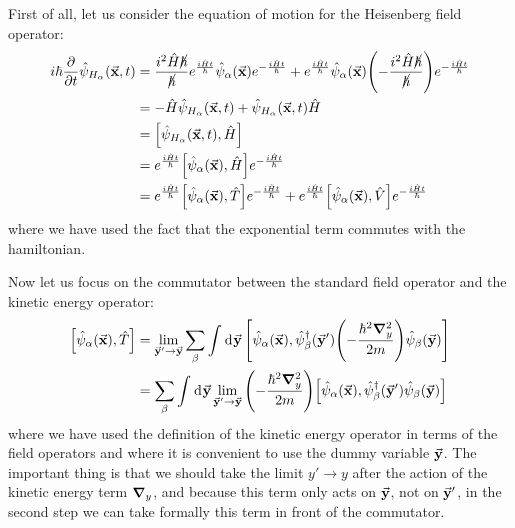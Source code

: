 \documentclass[../main/main.tex]{subfiles}
\begin{document}
First of all, let us consider the equation of motion for the Heisenberg field operator: 
\begin{equation}
\begin{split}
i \hbar  \pdv{}{t} \hat{\psi }_{H_ \alpha } (\va{x},t)   &=
\frac{i^2 \hat{H} \cancel{\hbar}  }{\cancel{\hbar } } e^{\frac{i \hat{H} t}{\hbar }} \hat{\psi }_ \alpha (\va{x}) e^{-\frac{i \hat{H} t}{\hbar }}  +
e^{\frac{i \hat{H} t}{\hbar }} \hat{\psi }_ \alpha (\va{x}) \qty(-\frac{i^2 \hat{H} \cancel{\hbar }  }{\cancel{\hbar }}) e^{-\frac{i \hat{H} t}{\hbar }}    \\
& = - \hat{H} \hat{\psi }_{H _ \alpha } (\va{x},t) +  \hat{\psi }_{H _ \alpha } (\va{x},t)   \hat{H} \\
&= \qty[\hat{\psi }_{H _ \alpha } (\va{x},t) , \hat{H} ] \\
& = e^{\frac{i \hat{H} t}{\hbar }} \qty[\hat{\psi }_{\alpha } (\va{x}) , \hat{H} ]  e^{-\frac{i \hat{H} t}{\hbar }} \\
& = e^{\frac{i \hat{H} t}{\hbar }} \qty[\hat{\psi }_{\alpha } (\va{x}) , \hat{T} ]  e^{-\frac{i \hat{H} t}{\hbar }} + e^{\frac{i \hat{H} t}{\hbar }} \qty[\hat{\psi }_{\alpha } (\va{x}) , \hat{V} ]  e^{-\frac{i \hat{H} t}{\hbar }}
\end{split}
\label{eq:7_3}
\end{equation}
where we have used the fact that the exponential term commutes with the hamiltonian.

Now let us focus on the commutator between the standard field operator and the kinetic energy operator: 
\begin{equation*}
\begin{split}
\qty[\hat{\psi }_{\alpha } (\va{x}) , \hat{T} ]  &=
\lim_{\va{y}'\rightarrow \va{y}} \sum_{\beta }^{} \int_{}^{} \dd[]{\va{y}} \qty[  \hat{\psi }_ \alpha  (\va{x}), \hat{\psi }_ \beta ^\dag  (\va{y}')  \qty(- \frac{\hbar ^2 \grad ^2_y}{2m}) \hat{\psi }_ \beta (\va{y})    ]     \\
& = \sum_{\beta }^{} \int_{}^{} \dd[]{\va{y}}     \lim_{\va{y}'\rightarrow \va{y}}
\qty(- \frac{\hbar ^2 \grad ^2_y}{2m}) \qty[\hat{\psi }_ \alpha (\va{x}), \hat{\psi }_ \beta ^\dag   (\va{y}') \hat{\psi }_ \beta (\va{y})   ]
\end{split}
\end{equation*}
where we have used the definition of the kinetic energy operator in terms of the field operators and where it is convenient to use the dummy variable \( \va{y} \). The important thing is that we should take the limit \( y' \rightarrow y \) after the action of the kinetic energy term \( \grad _y \), and because this term only acts on \( \va{y} \), not on \( \va{y}' \), in the second step we can take formally this term in front of the commutator.
\end{document}
